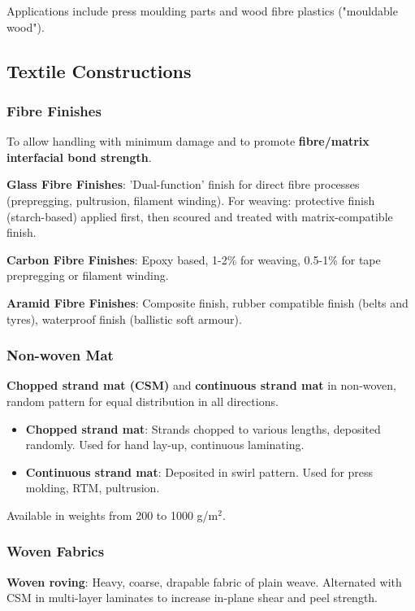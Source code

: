 \documentclass{NoteThesis/note-thesis}
\begin{document}
Applications include press moulding parts and wood fibre plastics ("mouldable wood").

\subsection{Textile Constructions}

\subsubsection*{Fibre Finishes}

To allow handling with minimum damage and to promote \textbf{fibre/matrix interfacial bond strength}.

\textbf{Glass Fibre Finishes}: 'Dual-function' finish for direct fibre processes (prepregging, pultrusion, filament winding). For weaving: protective finish (starch-based) applied first, then scoured and treated with matrix-compatible finish.

\textbf{Carbon Fibre Finishes}: Epoxy based, 1-2\% for weaving, 0.5-1\% for tape prepregging or filament winding.

\textbf{Aramid Fibre Finishes}: Composite finish, rubber compatible finish (belts and tyres), waterproof finish (ballistic soft armour).

\subsubsection*{Non-woven Mat}

\textbf{Chopped strand mat (CSM)} and \textbf{continuous strand mat} in non-woven, random pattern for equal distribution in all directions.

\begin{itemize}
    \item \textbf{Chopped strand mat}: Strands chopped to various lengths, deposited randomly. Used for hand lay-up, continuous laminating.
    \item \textbf{Continuous strand mat}: Deposited in swirl pattern. Used for press molding, RTM, pultrusion.
\end{itemize}

Available in weights from 200 to 1000 g/m$^2$.

\subsubsection*{Woven Fabrics}

\textbf{Woven roving}: Heavy, coarse, drapable fabric of plain weave. Alternated with CSM in multi-layer laminates to increase in-plane shear and peel strength.
\end{document}
